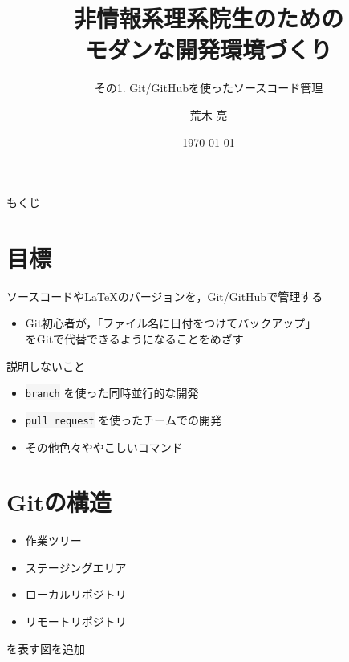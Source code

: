 \documentclass[12pt,dvipdfmx,svgnames,uplatex,aspectratio=169]{beamer}
\title{非情報系理系院生のための \\
  モダンな開発環境づくり}
\subtitle{その1. Git/GitHubを使ったソースコード管理}
\author{荒木 亮}
\institute{阪大院基礎工・後藤研}
\date{\today}
\newcommand{\git}[1]{{\colorbox{WhiteSmoke}{\texttt{#1}}}}  %
\begin{document}
\frame{\maketitle}
\begin{frame}{もくじ}
  \tableofcontents
\end{frame}

\section{目標}
\begin{frame}{\insertsection}
  \begin{screen}
    \centering
    ソースコードやLaTeXのバージョンを，Git/GitHubで管理する
  \end{screen}

  \begin{itemize}
    \item Git初心者が，「ファイル名に日付をつけてバックアップ」\\をGitで代替できるようになることをめざす
  \end{itemize}

  \begin{alertblock}{説明しないこと}
    \begin{itemize}
      \item \git{branch} を使った同時並行的な開発
      \item \git{pull request} を使ったチームでの開発
      \item その他色々ややこしいコマンド
    \end{itemize}
  \end{alertblock}
\end{frame}

\section{Gitの構造}
\begin{frame}{\insertsection}
  \begin{screen}
    \begin{itemize}
      \item 作業ツリー
      \item ステージングエリア
      \item ローカルリポジトリ
      \item リモートリポジトリ
    \end{itemize}
    を表す図を追加
  \end{screen}
\end{frame}
\end{document}
